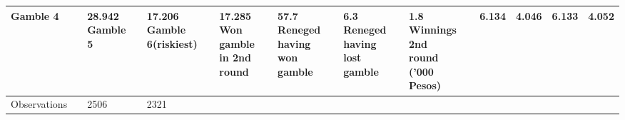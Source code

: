 \documentclass[]{tufte-handout}
\begin{document}
\begin{table}[H]
\begin{tabular}{l|>{\em}l|l|>{}l||l|l}
\hline
\hspace{1em}Gamble 4 &  & 28.942%
\hline
\hspace{1em}Gamble 5 &  & 17.206%
\hline
\hspace{1em}Gamble 6(riskiest) &  & 17.285%
\hline
Won gamble in 2nd round &  & 57.7%
\hline
Reneged having won gamble &  & 6.3%
\hline
Reneged having lost gamble &  & 1.8%
\hline
Winnings 2nd round ('000 Pesos) &  & 6.134 & 4.046 & 6.133 & 4.052\\
\hline
Observations &  & 2506 &  & 2321 & \\
\hline
\end{tabular}
\endgroup{}
\end{table}
\end{document}
